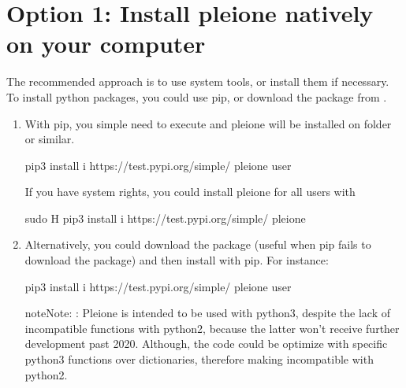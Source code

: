 \documentclass[letterpaper,10pt,english]{sphinxmanual}
\begin{document}
\section{Option 1: Install pleione natively on your computer}
\label{\detokenize{Installation:option-1-install-pleione-natively-on-your-computer}}
The recommended approach is to use system tools, or install them if
necessary. To install python packages, you could use pip, or download
the package from .
\begin{enumerate}
\def\theenumi{\arabic{enumi}}
\def\labelenumi{\theenumi .}
\makeatletter\def\p@enumii{\p@enumi \theenumi .}\makeatother
\item {} 

With pip, you simple need to execute and pleione will be installed on
 folder or similar.

\begin{sphinxVerbatim}[commandchars=\\\{\}]
pip3 install \PYGZhy{}i https://test.pypi.org/simple/ pleione \PYGZhy{}\PYGZhy{}user
\end{sphinxVerbatim}

If you have system rights, you could install pleione for all users with

\begin{sphinxVerbatim}[commandchars=\\\{\}]
sudo \PYGZhy{}H pip3 install \PYGZhy{}i https://test.pypi.org/simple/ pleione
\end{sphinxVerbatim}

\item {} 

Alternatively, you could download the package (useful when pip fails to
download the package) and then install with pip. For instance:

\begin{sphinxVerbatim}[commandchars=\\\{\}]
pip3 install \PYGZhy{}i https://test.pypi.org/simple/ pleione \PYGZhy{}\PYGZhy{}user
\end{sphinxVerbatim}

\begin{sphinxadmonition}{note}{Note:}
:
Pleione is intended to be used with python3, despite the lack of
incompatible functions with python2, because the latter won’t receive
further development past 2020. Although, the code could be optimize with
specific python3 functions over dictionaries, therefore making incompatible
with python2.
\end{sphinxadmonition}


\end{enumerate}
\end{document}

